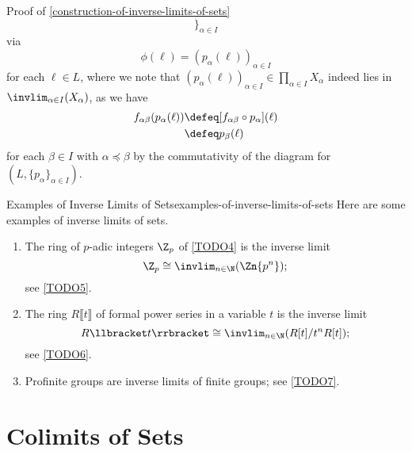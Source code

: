 \begin{Proof}{Proof of \cref{construction-of-inverse-limits-of-sets}}
\[        \}_{\alpha\in I}%
    \]%
    via
    \[
        \phi(\ell)%
        =%
        (p_{\alpha}(\ell))_{\alpha\in I}
    \]%
    for each $\ell\in L$, where we note that $(p_{\alpha}(\ell))_{\alpha\in I}\in\prod_{\alpha\in I}X_{\alpha}$ indeed lies in $\invlim_{\alpha\in I}(X_{\alpha})$, as we have
    \begin{align*}
        f_{\alpha\beta}(p_{\alpha}(\ell)) &\defeq [f_{\alpha\beta}\circ p_{\alpha}](\ell)\\
                                          &\defeq p_{\beta}(\ell)
    \end{align*}
    for each $\beta\in I$ with $\alpha\preceq\beta$ by the commutativity of the diagram for $(L,\{p_{\alpha}\}_{\alpha\in I})$.
\end{Proof}
\begin{example}{Examples of Inverse Limits of Sets}{examples-of-inverse-limits-of-sets}%
    Here are some examples of inverse limits of sets.
    \begin{enumerate}
        \item\label{examples-of-inverse-limits-of-sets-the-p-adic-integers}The ring of $p$-adic integers $\Z_{p}$ of \cref{TODO4} is the inverse limit
            \[
                \Z_{p}%
                \cong%
                \invlim_{n\in\N}(\Zn{p^{n}});%
            \]%
            see \cref{TODO5}.
        \item\label{examples-of-inverse-limits-of-sets-rings-of-formal-power-series}The ring $R\llbracket t\rrbracket$ of formal power series in a variable $t$ is the inverse limit
            \[
                R\llbracket t\rrbracket%
                \cong%
                \invlim_{n\in\N}(R[t]/t^{n}R[t]);%
            \]%
            see \cref{TODO6}.
        \item\label{examples-of-inverse-limits-of-sets-profinite-groups}Profinite groups are inverse limits of finite groups; see \cref{TODO7}.
    \end{enumerate}
\end{example}
\section{Colimits of Sets}\label{section-colimits-of-sets}
